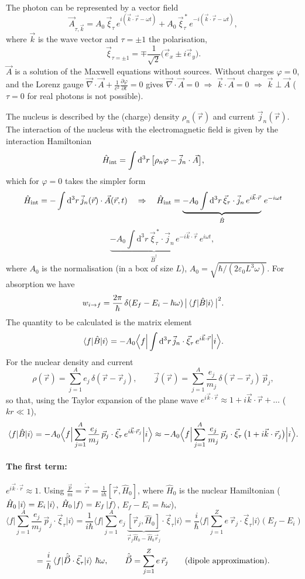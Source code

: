 \documentclass[11pt,a4paper]{article}
\newcommand{\op}[1]{\hat{#1}}
\newcommand{\ud}{\mathrm{d}}
\begin{document}
The photon can be represented by a vector field
\[
\vec A_{\tau,\vec k}=A_0\,\vec\xi_\tau\,e^{i(\vec k\cdot\vec r-\omega t)}+A_0\,\vec\xi^{\,*}_\tau\,e^{-i(\vec k\cdot\vec r-\omega t)},
\]
where $\vec k$ is the wave vector and $\tau=\pm1$ the polarisation,
\[
\vec\xi_{\tau=\pm1}=\mp\frac{1}{\sqrt2}\big(\vec e_x\pm i\vec e_y\big).
\]
$\vec A$ is a solution of the Maxwell equations without sources. Without charges $\varphi=0$, and the Lorenz gauge $\vec\nabla\cdot\vec A+\frac{1}{c^2}\frac{\partial\varphi}{\partial t}=0$ gives $\vec\nabla\cdot\vec A=0$ $\Rightarrow$ $\vec k\cdot\vec A=0$ $\Rightarrow$ $\vec k\perp\vec A$ ($\tau=0$ for real photons is not possible).

The nucleus is described by the (charge) density $\rho_n(\vec r)$ and current $\vec j_n(\vec r)$. The interaction of the nucleus with the electromagnetic field is given by the interaction Hamiltonian
\[
\op H_{\rm int}=\int\ud^3r\,\big[\rho_n\varphi-\vec j_n\cdot\vec A\big],
\]
which for $\varphi=0$ takes the simpler form
\[
\op H_{\rm int}=-\int\ud^3r\,\vec j_n(\vec r)\cdot\vec A(\vec r,t)
\quad\Rightarrow\quad
\op H_{\rm int}=\underbrace{-A_0\int\ud^3r\,\vec\xi_\tau\cdot\vec j_n\,e^{i\vec k\cdot\vec r}}_{\op B}\,e^{-i\omega t}
\]
\[
\qquad\ \underbrace{-A_0\int\ud^3r\,\vec\xi^{\,*}_\tau\cdot\vec j_n\,e^{-i\vec k\cdot\vec r}}_{\op B^\dagger}\,e^{i\omega t},
\]
where $A_0$ is the normalisation (in a box of size $L$), $A_0=\sqrt{\hbar/(2\varepsilon_0L^3\omega)}$.
For absorption we have
\[
w_{i\to f}=\frac{2\pi}{\hbar}\,\delta(E_f-E_i-\hbar\omega)\,\big|\braket{f|\op B|i}\big|^2 .
\]
The quantity to be calculated is the matrix element
\[
\braket{f|\op B|i}=-A_0\Big\langle f\Big|\int\ud^3r\,\vec j_n\cdot\vec\xi_\tau\,e^{i\vec k\cdot\vec r}\Big|i\Big\rangle .
\]
For the nuclear density and current
\[
\rho(\vec r)=\sum_{j=1}^Ae_j\,\delta(\vec r-\vec r_j),\qquad
\vec j(\vec r)=\sum_{j=1}^A\frac{e_j}{m_j}\,\delta(\vec r-\vec r_j)\,\vec p_j ,
\]
so that, using the Taylor expansion of the plane wave $e^{i\vec k\cdot\vec r}\approx1+i\vec k\cdot\vec r+\dots$ ($kr\ll1$),
\[
\braket{f|\op B|i}=-A_0\Big\langle f\Big|\sum_{j=1}^A\frac{e_j}{m_j}\,\vec p_j\cdot\vec\xi_\tau\,e^{i\vec k\cdot\vec r_j}\Big|i\Big\rangle
\approx-A_0\Big\langle f\Big|\sum_{j=1}^A\frac{e_j}{m_j}\,\vec p_j\cdot\vec\xi_\tau\,\big(1+i\vec k\cdot\vec r_j\big)\Big|i\Big\rangle .
\]

\paragraph{The first term:} $e^{i\vec k\cdot\vec r}\approx1$. Using $\frac{\vec p}{m}=\dot{\vec r}=\frac{1}{i\hbar}[\vec r,\op H_0]$, where $\op H_0$ is the nuclear Hamiltonian ($\op H_0\ket i=E_i\ket i$, $\op H_0\ket f=E_f\ket f$, $E_f-E_i=\hbar\omega$),
\[
\Big\langle f\Big|\sum_{j=1}^A\frac{e_j}{m_j}\,\vec p_j\cdot\vec\xi_\tau\Big|i\Big\rangle
=\frac{1}{i\hbar}\Big\langle f\Big|\sum_{j=1}^Ae_j\,\underbrace{[\vec r_j,\op H_0]}_{\vec r_j\op H_0-\op H_0\vec r_j}\cdot\vec\xi_\tau\Big|i\Big\rangle
=\frac{i}{\hbar}\Big\langle f\Big|\sum_{j=1}^Z e\,\vec r_j\cdot\vec\xi_\tau\Big|i\Big\rangle(E_f-E_i)
\]
\[
=\frac{i}{\hbar}\braket{f|\op{\vec D}\cdot\vec\xi_\tau|i}\,\hbar\omega,
\qquad
\op{\vec D}=\sum_{j=1}^Ze\,\vec r_j\qquad\text{(dipole approximation)}.
\]
\end{document}
